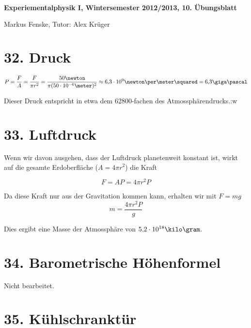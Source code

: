 \documentclass[a4paper,german,12pt,smallheadings]{scrartcl}
\begin{document}
\begin{center}
\bfseries %
\sffamily %
\vspace{-40pt}
Experiementalphysik I, Wintersemester 2012/2013, 10. Übungsblatt

Markus Fenske, Tutor: Alex Krüger
\vspace{-10pt}
\end{center}


\section*{32. Druck}

\begin{equation}
  P = \frac{F}{A} = \frac{F}{\pi r^2} = \frac{50 \newton}{\pi (50 \cdot 10^{-6} \meter)^2} \approx 6{,}3 \cdot 10^9 \newton\per\meter\squared = 6{,}3 \giga\pascal 
\end{equation}

Dieser Druck entspricht in etwa dem 62800-fachen des Atmossphärendrucks.:w

\section*{33. Luftdruck}

Wenn wir davon ausgehen, dass der Luftdruck planetenweit konstant ist, wirkt
auf die gesamte Erdoberfläche ($A = 4 \pi r^2$) die Kraft

\begin{equation}
  F = AP = 4 \pi r^2 P
\end{equation}

Da diese Kraft nur aus der Gravitation kommen kann, erhalten wir mit $F = mg$
\begin{equation}
  m = \frac{4 \pi r^2 P}{g}
\end{equation}

Dies ergibt eine Masse der Atmossphäre von $5{,}2 \cdot 10^{18} \kilo\gram$.

\section*{34. Barometrische Höhenformel}

Nicht bearbeitet.

\section*{35. Kühlschranktür}
\end{document}
